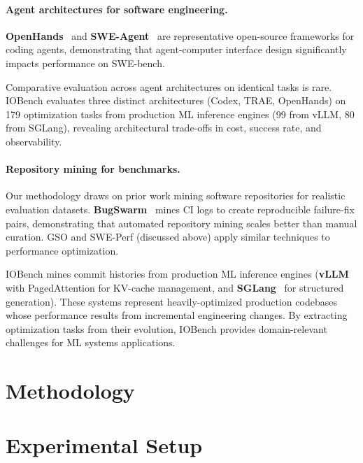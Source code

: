 \documentclass{article}
\theoremstyle{plain}
\theoremstyle{definition}
\theoremstyle{remark}
\begin{document}
\paragraph{Agent architectures for software engineering.}
\textbf{OpenHands}~\citep{wang2024openhands} and \textbf{SWE-Agent}~\citep{yang2024sweagent} are representative open-source frameworks for coding agents, demonstrating that agent-computer interface design significantly impacts performance on SWE-bench.

Comparative evaluation across agent architectures on identical tasks is rare. IOBench evaluates three distinct architectures (Codex, TRAE, OpenHands) on 179 optimization tasks from production ML inference engines (99 from vLLM, 80 from SGLang), revealing architectural trade-offs in cost, success rate, and observability.

\paragraph{Repository mining for benchmarks.}
Our methodology draws on prior work mining software repositories for realistic evaluation datasets.
\textbf{BugSwarm}~\citep{tomassi2019bugswarm} mines CI logs to create reproducible failure-fix pairs, demonstrating that automated repository mining scales better than manual curation.
GSO and SWE-Perf (discussed above) apply similar techniques to performance optimization.

IOBench mines commit histories from production ML inference engines (\textbf{vLLM}~\citep{kwon2023vllm} with PagedAttention for KV-cache management, and \textbf{SGLang}~\citep{zheng2023sglang} for structured generation).
These systems represent heavily-optimized production codebases whose performance results from incremental engineering changes.
By extracting optimization tasks from their evolution, IOBench provides domain-relevant challenges for ML systems applications.

\section{Methodology}
\label{sec:methodology}


\section{Experimental Setup}
\label{sec:experiments}
\end{document}
